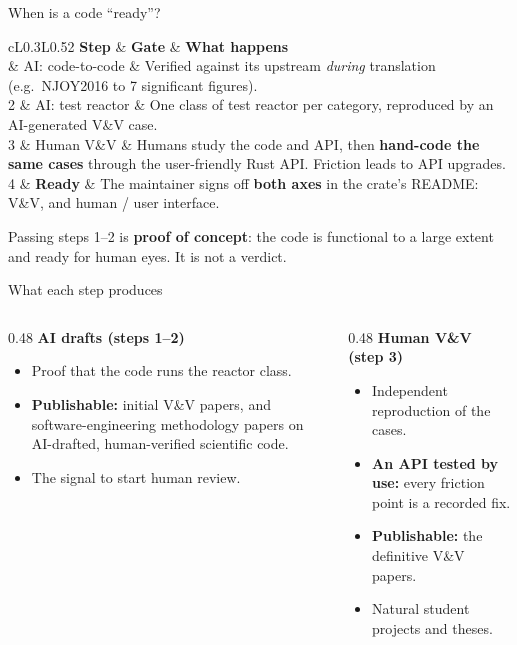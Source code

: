 \documentclass[aspectratio=169]{beamer}
\newcommand{\roadtab}[1]{{\footnotesize\setlength{\tabcolsep}{4pt}#1}}
\begin{document}
\begin{frame}{When is a code ``ready''?}
    \roadtab{
    \begin{tabular}{cL{0.3\textwidth}L{0.52\textwidth}}
        \toprule
        \textbf{Step} & \textbf{Gate} & \textbf{What happens} \\
        \midrule
        1 & AI: code-to-code & Verified against its upstream \emph{during}
            translation (e.g.\ NJOY2016 to 7 significant figures). \\[2pt]
        2 & AI: test reactor & One class of test reactor per category,
            reproduced by an AI-generated V\&V case. \\[2pt]
        3 & Human V\&V & Humans study the code and API, then
            \textbf{hand-code the same cases} through the user-friendly Rust
            API. Friction leads to API upgrades. \\[2pt]
        4 & \textbf{Ready} & The maintainer signs off \textbf{both axes}
            in the crate's README: V\&V, and human / user interface. \\
        \bottomrule
    \end{tabular}}

    \medskip
    \footnotesize
    Passing steps 1--2 is \textbf{proof of concept}: the code is functional
    to a large extent and ready for human eyes. It is not a verdict.
\end{frame}

\begin{frame}{What each step produces}
    \begin{columns}[T]
        \begin{column}{0.48\textwidth}
            \textbf{AI drafts (steps 1--2)}
            \begin{itemize}
                \footnotesize
                \item Proof that the code runs the reactor class.
                \item \textbf{Publishable:} initial V\&V papers, and
                      software-engineering methodology papers on AI-drafted,
                      human-verified scientific code.
                \item The signal to start human review.
            \end{itemize}
        \end{column}
        \begin{column}{0.48\textwidth}
            \textbf{Human V\&V (step 3)}
            \begin{itemize}
                \footnotesize
                \item Independent reproduction of the cases.
                \item \textbf{An API tested by use:} every friction point is
                      a recorded fix.
                \item \textbf{Publishable:} the definitive V\&V papers.
                \item Natural student projects and theses.
            \end{itemize}
        \end{column}
    \end{columns}
\end{frame}
\end{document}
